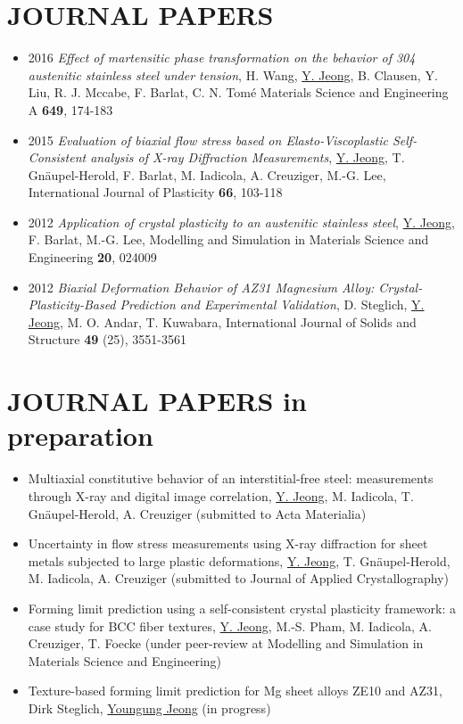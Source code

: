 \documentclass{res}
\begin{document}
\begin{resume}
  \section{JOURNAL PAPERS}
  \begin{itemize}
  \item 2016 {\it Effect of martensitic phase transformation on the behavior of 304 austenitic stainless steel under tension}, H. Wang, \underline{Y. Jeong}, B. Clausen, Y. Liu, R. J. Mccabe, F. Barlat, C. N. Tom\'{e} Materials Science and Engineering A {\bf 649}, 174-183
  \item 2015 {\it Evaluation of biaxial flow stress based on Elasto-Viscoplastic Self-Consistent analysis of X-ray Diffraction Measurements}, \underline{Y. Jeong}, T. Gn\"{a}upel-Herold, F. Barlat, M. Iadicola, A. Creuziger, M.-G. Lee, International Journal of Plasticity {\bf 66}, 103-118
  \item 2012 {\it Application of crystal plasticity to an austenitic stainless steel}, \underline{Y. Jeong}, F. Barlat, M.-G. Lee, Modelling and Simulation in Materials Science and Engineering {\bf 20}, 024009
  \item 2012 {\it Biaxial Deformation Behavior of AZ31 Magnesium Alloy: Crystal-Plasticity-Based Prediction and Experimental Validation}, D. Steglich, \underline{Y. Jeong}, M. O. Andar, T. Kuwabara, International Journal of Solids and Structure {\bf 49} (25), 3551-3561
  \end{itemize}

  \section{JOURNAL PAPERS in preparation}
  \begin{itemize}
  \item Multiaxial constitutive behavior of an interstitial-free steel: measurements through X-ray and digital image correlation, \underline{Y. Jeong}, M. Iadicola, T. Gn\"{a}upel-Herold, A. Creuziger (submitted to Acta Materialia)
  \item Uncertainty in flow stress measurements using X-ray diffraction for sheet metals subjected to large plastic deformations, \underline{Y. Jeong}, T. Gn\"{a}upel-Herold, M. Iadicola, A. Creuziger (submitted to Journal of Applied Crystallography)
  \item Forming limit prediction using a self-consistent crystal plasticity framework: a case study for BCC fiber textures, \underline{Y. Jeong}, M.-S. Pham, M. Iadicola, A. Creuziger, T. Foecke (under peer-review at Modelling and Simulation in Materials Science and Engineering)
  \item Texture-based forming limit prediction for Mg sheet alloys ZE10 and AZ31, Dirk Steglich, \underline{Youngung Jeong} (in progress)
  \end{itemize}


\end{resume}
\end{document}
